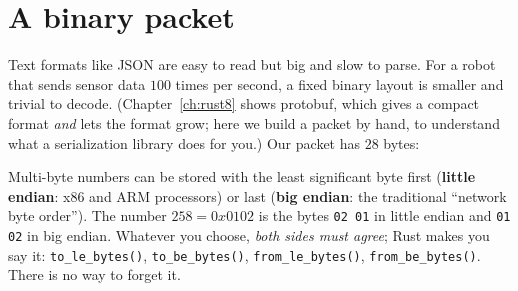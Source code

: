\section*{A binary packet}
Text formats like JSON are easy to read but big and slow to parse. For a robot that sends sensor data $100$ times per second, a fixed binary layout is smaller and trivial to decode. (Chapter~\ref{ch:rust8} shows protobuf, which gives a compact format \emph{and} lets the format grow; here we build a packet by hand, to understand what a serialization library does for you.) Our packet has $28$ bytes:
\begin{center}
\end{center}
Multi-byte numbers can be stored with the least significant byte first (\textbf{little endian}: x86 and ARM processors) or last (\textbf{big endian}: the traditional ``network byte order''). The number $258=0x0102$ is the bytes \verb!02 01! in little endian and \verb!01 02! in big endian. Whatever you choose, \emph{both sides must agree}; Rust makes you say it: \verb!to_le_bytes()!, \verb!to_be_bytes()!, \verb!from_le_bytes()!, \verb!from_be_bytes()!. There is no way to forget it.
